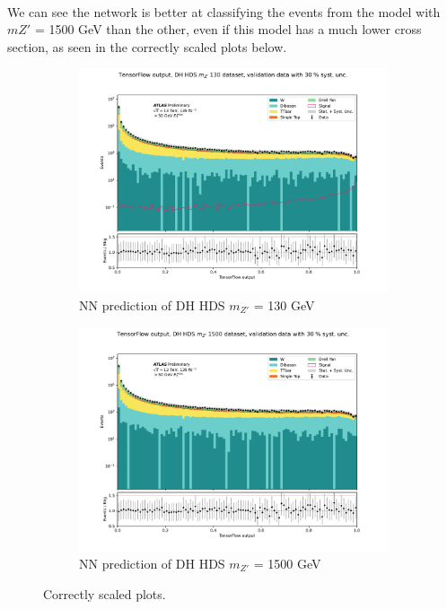 \documentclass[14pt, a4paper]{book}
\begin{document}
\\We can see the network is better at classifying the events from the model with $m{Z'}$ = 1500 GeV than the other, even if this model has a much lower cross section, as seen in the correctly scaled plots below.
\begin{figure}[!ht]
	\centering
	\begin{subfigure}[b]{0.49\textwidth}
        \centering
        \includegraphics[width=1\textwidth]{DH_HDS_mZp_130/VAL.pdf}
        \caption{NN prediction of DH HDS $m_{Z'}$ = 130 GeV}
     \end{subfigure}
     \hfill
     \begin{subfigure}[b]{0.49\textwidth}
        \centering
        \includegraphics[width=1\textwidth]{DH_HDS_mZp_1500/VAL.pdf}
        \caption{NN prediction of DH HDS $m_{Z'}$ = 1500 GeV}
     \end{subfigure}
     \caption{Correctly scaled plots.}\label{fig:SCALED_PurelyBalanced_DH_HDS}
\end{figure}
\end{document}
